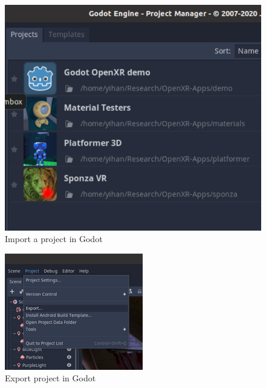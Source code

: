 \documentclass{sigplanconf}
\begin{document}
\begin{figure}[h]
  \caption{Import a project in Godot}
  \includegraphics[width=\linewidth]{import.png}
\end{figure}

\begin{figure}[h]
  \caption{Export project in Godot}
  \includegraphics[width=\linewidth]{export.png}
\end{figure}
\end{document}
